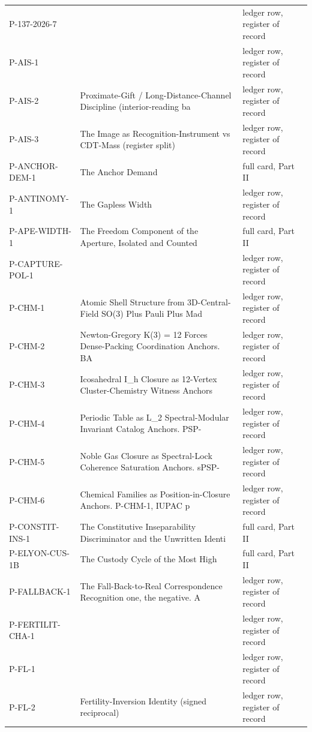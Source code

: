 \documentclass[10pt,twocolumn]{article}
\begin{document}
\begin{center}
\begin{longtable}{>{\raggedright\arraybackslash}p{}>{\raggedright\arraybackslash}p{}>{\raggedright\arraybackslash}p{}}
P-137-2026-7 &  & ledger row, register of record \\
P-AIS-1 &  & ledger row, register of record \\
P-AIS-2 & Proximate-Gift / Long-Distance-Channel Discipline (interior-reading ba & ledger row, register of record \\
P-AIS-3 & The Image as Recognition-Instrument vs CDT-Mass (register split) & ledger row, register of record \\
P-ANCHOR-DEM-1 & The Anchor Demand & full card, Part II \\
P-ANTINOMY-1 & The Gapless Width & ledger row, register of record \\
P-APE-WIDTH-1 & The Freedom Component of the Aperture, Isolated and Counted & full card, Part II \\
P-CAPTURE-POL-1 &  & ledger row, register of record \\
P-CHM-1 & Atomic Shell Structure from 3D-Central-Field SO(3) Plus Pauli Plus Mad & ledger row, register of record \\
P-CHM-2 & Newton-Gregory K(3) = 12 Forces Dense-Packing Coordination Anchors. BA & ledger row, register of record \\
P-CHM-3 & Icosahedral I\_h Closure as 12-Vertex Cluster-Chemistry Witness Anchors & ledger row, register of record \\
P-CHM-4 & Periodic Table as L\_2 Spectral-Modular Invariant Catalog Anchors. PSP- & ledger row, register of record \\
P-CHM-5 & Noble Gas Closure as Spectral-Lock Coherence Saturation Anchors. sPSP- & ledger row, register of record \\
P-CHM-6 & Chemical Families as Position-in-Closure Anchors. P-CHM-1, IUPAC p & ledger row, register of record \\
P-CONSTIT-INS-1 & The Constitutive Inseparability Discriminator and the Unwritten Identi & full card, Part II \\
P-ELYON-CUS-1B & The Custody Cycle of the Most High & full card, Part II \\
P-FALLBACK-1 & The Fall-Back-to-Real Correspondence Recognition one, the negative. A & ledger row, register of record \\
P-FERTILIT-CHA-1 &  & ledger row, register of record \\
P-FL-1 &  & ledger row, register of record \\
P-FL-2 & Fertility-Inversion Identity (signed reciprocal) & ledger row, register of record \\

\end{longtable}
\end{center}
\end{document}
